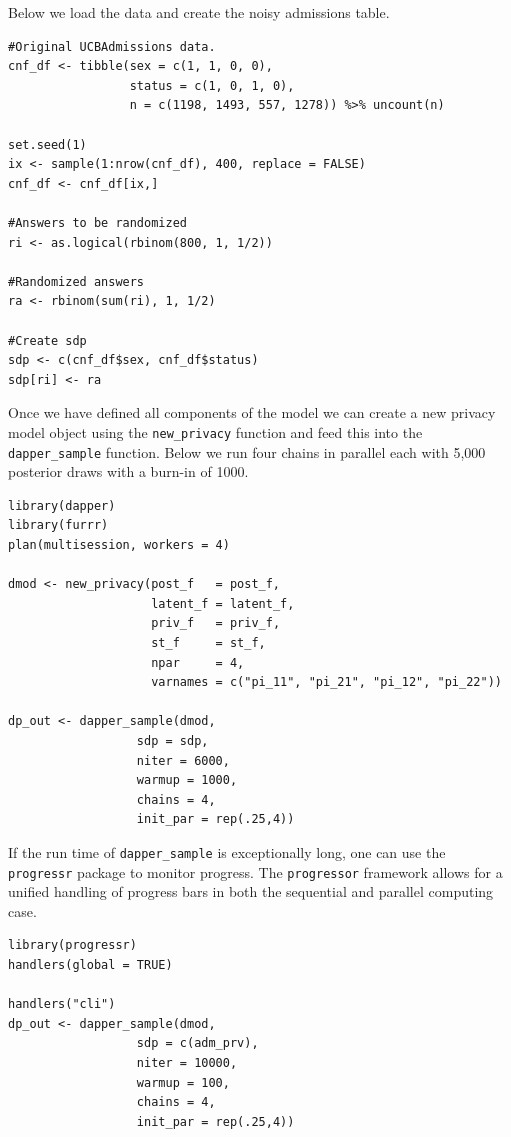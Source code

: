 Below we load the data and create the noisy admissions table.

\begin{verbatim}
#Original UCBAdmissions data.
cnf_df <- tibble(sex = c(1, 1, 0, 0),
                 status = c(1, 0, 1, 0),
                 n = c(1198, 1493, 557, 1278)) %>% uncount(n)

set.seed(1) 
ix <- sample(1:nrow(cnf_df), 400, replace = FALSE)
cnf_df <- cnf_df[ix,]

#Answers to be randomized
ri <- as.logical(rbinom(800, 1, 1/2)) 

#Randomized answers
ra <- rbinom(sum(ri), 1, 1/2)

#Create sdp
sdp <- c(cnf_df$sex, cnf_df$status)
sdp[ri] <- ra
\end{verbatim}

Once we have defined all components of the model we can
create a new privacy model object using the \texttt{new\_privacy} function and
feed this into the \texttt{dapper\_sample} function. Below we run four chains
in parallel each with 5,000 posterior draws with a burn-in of 1000.

\begin{verbatim}
library(dapper)
library(furrr)
plan(multisession, workers = 4)

dmod <- new_privacy(post_f   = post_f,
                    latent_f = latent_f,
                    priv_f   = priv_f,
                    st_f     = st_f,
                    npar     = 4,
                    varnames = c("pi_11", "pi_21", "pi_12", "pi_22"))
                  
dp_out <- dapper_sample(dmod,
                  sdp = sdp,
                  niter = 6000,
                  warmup = 1000,
                  chains = 4,
                  init_par = rep(.25,4))
\end{verbatim}

If the run time of \texttt{dapper\_sample} is exceptionally long, one can
use the \texttt{progressr} package to monitor progress. The \texttt{progressor} framework
allows for a unified handling of progress bars in both the sequential and
parallel computing case.

\begin{verbatim}
library(progressr)
handlers(global = TRUE)

handlers("cli")
dp_out <- dapper_sample(dmod,
                  sdp = c(adm_prv),
                  niter = 10000,
                  warmup = 100,
                  chains = 4,
                  init_par = rep(.25,4))
\end{verbatim}

